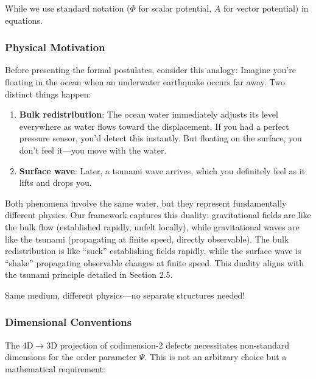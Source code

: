 While we use standard notation ($\Phi$ for scalar potential, $A$ for vector potential) in equations.

\subsubsection{Physical Motivation}

Before presenting the formal postulates, consider this analogy: Imagine you're floating in the ocean when an underwater earthquake occurs far away. Two distinct things happen:

\begin{enumerate}
\item \textbf{Bulk redistribution}: The ocean water immediately adjusts its level everywhere as water flows toward the displacement. If you had a perfect pressure sensor, you'd detect this instantly. But floating on the surface, you don't feel it—you move with the water.
\item \textbf{Surface wave}: Later, a tsunami wave arrives, which you definitely feel as it lifts and drops you.
\end{enumerate}

Both phenomena involve the same water, but they represent fundamentally different physics. Our framework captures this duality: gravitational fields are like the bulk flow (established rapidly, unfelt locally), while gravitational waves are like the tsunami (propagating at finite speed, directly observable). The bulk redistribution is like ``suck'' establishing fields rapidly, while the surface wave is ``shake'' propagating observable changes at finite speed. This duality aligns with the tsunami principle detailed in Section 2.5.

Same medium, different physics—no separate structures needed!


\subsubsection{Dimensional Conventions}

The 4D$\to$3D projection of codimension-2 defects necessitates non-standard dimensions for the order parameter $\Psi$. This is not an arbitrary choice but a mathematical requirement:

